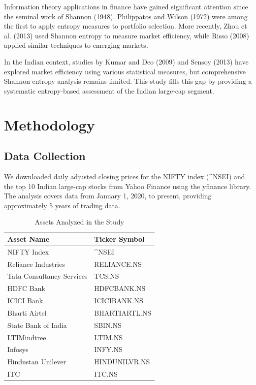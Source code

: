 \documentclass[12pt,a4paper]{article}
\begin{document}
Information theory applications in finance have gained significant attention since the seminal work of Shannon (1948). Philippatos and Wilson (1972) were among the first to apply entropy measures to portfolio selection. More recently, Zhou et al. (2013) used Shannon entropy to measure market efficiency, while Risso (2008) applied similar techniques to emerging markets.

In the Indian context, studies by Kumar and Deo (2009) and Sensoy (2013) have explored market efficiency using various statistical measures, but comprehensive Shannon entropy analysis remains limited. This study fills this gap by providing a systematic entropy-based assessment of the Indian large-cap segment.

\section{Methodology}

\subsection{Data Collection}

We downloaded daily adjusted closing prices for the NIFTY index (\textasciicircum{}NSEI) and the top 10 Indian large-cap stocks from Yahoo Finance using the yfinance library. The analysis covers data from January 1, 2020, to present, providing approximately 5 years of trading data.

\begin{table}[h]
\centering
\caption{Assets Analyzed in the Study}
\begin{tabular}{@{}ll@{}}
\toprule
\textbf{Asset Name} & \textbf{Ticker Symbol} \\ \midrule
NIFTY Index & \^{}NSEI \\
Reliance Industries & RELIANCE.NS \\
Tata Consultancy Services & TCS.NS \\
HDFC Bank & HDFCBANK.NS \\
ICICI Bank & ICICIBANK.NS \\
Bharti Airtel & BHARTIARTL.NS \\
State Bank of India & SBIN.NS \\
LTIMindtree & LTIM.NS \\
Infosys & INFY.NS \\
Hindustan Unilever & HINDUNILVR.NS \\
ITC & ITC.NS \\ \bottomrule
\end{tabular}
\end{table}
\end{document}
